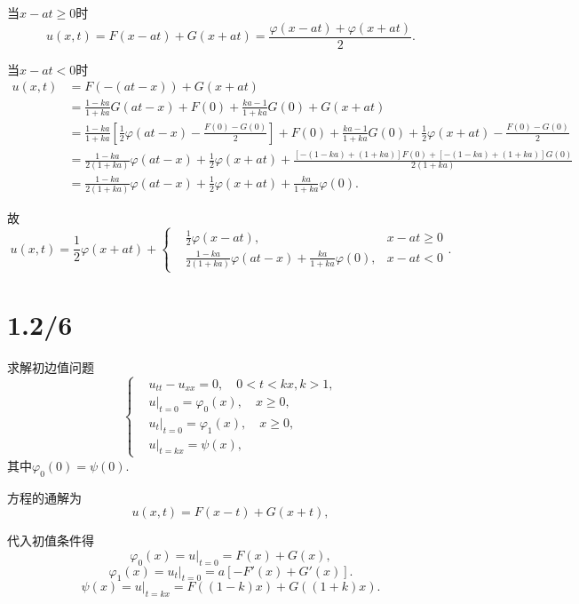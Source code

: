 \documentclass[11pt,a4paper]{article}
\begin{document}
当$x-at\geqslant 0$时
$$u(x,t)=F(x-at)+G(x+at)=\frac{\varphi(x-at)+\varphi(x+at)}{2}.$$

当$x-at<0$时
\begin{align*}
  u(x,t) & =F(-(at-x))+G(x+at)                                                                                                                                 \\
         & =\frac{1-ka}{1+ka}G(at-x)+F(0)+\frac{ka-1}{1+ka}G(0)+G(x+at)                                                                                        \\
         & =\frac{1-ka}{1+ka}\left[\frac{1}{2}\varphi(at-x)-\frac{F(0)-G(0)}{2}\right]+F(0)+\frac{ka-1}{1+ka}G(0)+\frac{1}{2}\varphi(x+at)-\frac{F(0)-G(0)}{2} \\
         & =\frac{1-ka}{2(1+ka)}\varphi(at-x)+\frac{1}{2}\varphi(x+at)+\frac{[-(1-ka)+(1+ka)]F(0)+[-(1-ka)+(1+ka)]G(0)}{2(1+ka)}                               \\
         & =\frac{1-ka}{2(1+ka)}\varphi(at-x)+\frac{1}{2}\varphi(x+at)+\frac{ka}{1+ka}\varphi(0).
\end{align*}

故
$$u(x,t)=\frac{1}{2}\varphi(x+at)+\left\{\begin{aligned}
     & \frac{1}{2}\varphi(x-at),                                    & x-at\geqslant 0 \\
     & \frac{1-ka}{2(1+ka)}\varphi(at-x)+\frac{ka}{1+ka}\varphi(0), & x-at<0
  \end{aligned}\right..$$

\section{1.2/6}
\begin{problem}
求解初边值问题
$$\left\{\begin{aligned}
     & u_{tt}-u_{xx}=0,\quad 0<t<kx,k>1,          \\
     & u|_{t=0}=\varphi_0(x),\quad x\geqslant0,   \\
     & u_t|_{t=0}=\varphi_1(x),\quad x\geqslant0, \\
     & u|_{t=kx}=\psi(x),
  \end{aligned}\right.$$
其中$\varphi_0(0)=\psi(0)$.
\end{problem}

方程的通解为
$$u(x,t)=F(x-t)+G(x+t),$$

代入初值条件得
$$\varphi_0(x)=u|_{t=0}=F(x)+G(x),$$
$$\varphi_1(x)=u_t|_{t=0}=a[-F'(x)+G'(x)].$$
$$\psi(x)=u|_{t=kx}=F((1-k)x)+G((1+k)x).$$
\end{document}
